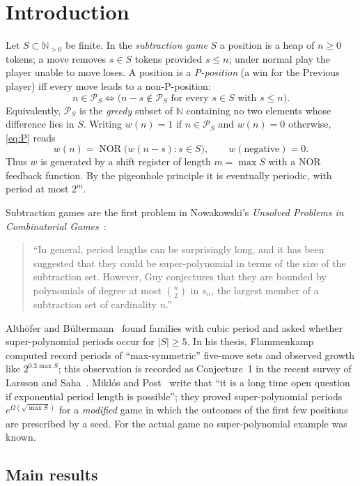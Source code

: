\documentclass[11pt]{article}
\theoremstyle{definition}
\newcommand{\N}{\mathbb{N}}
\newcommand{\cP}{\mathcal{P}}
\newcommand{\NOR}{\operatorname{NOR}}
\begin{document}
\section{Introduction}

Let $S\subset\N_{>0}$ be finite.  In the \emph{subtraction game} $S$ a position is a heap of
$n\ge 0$ tokens; a move removes $s\in S$ tokens provided $s\le n$; under normal play the player
unable to move loses.  A position is a \emph{P-position} (a win for the Previous player) iff every
move leads to a non-P-position:
\begin{equation}\label{eq:P}
  n\in\cP_S \iff \bigl(n-s\notin \cP_S \text{ for every } s\in S \text{ with } s\le n\bigr).
\end{equation}
Equivalently, $\cP_S$ is the \emph{greedy} subset of $\N$ containing no two elements whose
difference lies in $S$.  Writing $w(n)=1$ if $n\in\cP_S$ and $w(n)=0$ otherwise, \eqref{eq:P} reads
\[ w(n)=\NOR\bigl(w(n-s): s\in S\bigr), \qquad w(\text{negative})=0. \]
Thus $w$ is generated by a shift register of length $m=\max S$ with a NOR feedback function.  By the
pigeonhole principle it is eventually periodic, with period at most $2^m$.

Subtraction games are the first problem in Nowakowski's \emph{Unsolved Problems in Combinatorial
Games}~\cite{Nowakowski}:
\begin{quote}
``In general, period lengths can be surprisingly long, and it has been suggested that they could
be super-polynomial in terms of the size of the subtraction set.  However, Guy conjectures that they
are bounded by polynomials of degree at most $\binom{n}{2}$ in $s_n$, the largest member of a
subtraction set of cardinality $n$.''
\end{quote}
Althöfer and Bültermann~\cite{AB} found families with cubic period and asked whether
super-polynomial periods occur for $|S|\ge 5$.  In his thesis, Flammenkamp~\cite{Flammenkamp}
computed record periods of ``max-symmetric'' five-move sets and observed growth like
$2^{0.3\max S}$; this observation is recorded as Conjecture~1 in the recent survey of Larsson and
Saha~\cite{LS}.  Miklós and Post~\cite{MP} write that ``it is a long time open question if
exponential period length is possible''; they proved super-polynomial periods $e^{\Omega(\sqrt{\max S})}$
for a \emph{modified} game in which the outcomes of the first few positions are prescribed by a
seed.  For the actual game no super-polynomial example was known.

\subsection{Main results}
\end{document}
